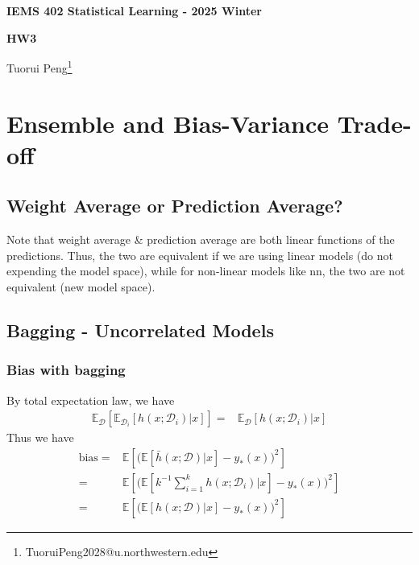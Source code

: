 \documentclass[11pt,a4paper]{ctexart}
\numberwithin{equation}{section}%
\begin{document}
\begin{center}\thispagestyle{plain}

{\LARGE\textbf{IEMS 402 Statistical Learning - 2025 Winter}}

{\Large\textbf{HW3}}

Tuorui Peng\footnote{TuoruiPeng2028@u.northwestern.edu}
\end{center}

\thispagestyle{myheadings}
\pagestyle{myheadings}




\section{Ensemble and Bias-Variance Trade-off}

\subsection{Weight Average or Prediction Average?}


Note that weight average \& prediction average are both linear functions of the predictions. Thus, the two are equivalent if we are using linear models (do not expending the model space), while for non-linear models like nn, the two are not equivalent (new model space).

\subsection{Bagging - Uncorrelated Models}

\subsubsection{Bias with bagging}

By total expectation law, we have
\begin{align*}
    \mathbb{E}_{\mathcal{D}}\left[ \mathbb{E}_{\mathcal{D}_i}\left[ h(x;\mathcal{D}_i)|x \right]   \right]  =& \mathbb{E}_{\mathcal{D}}\left[  h(x;\mathcal{D}_i)|x \right]   
\end{align*}
Thus we have
\begin{align*}
    \mathrm{ bias }=& \mathbb{E}\left[ \big(\mathbb{E}\left[ \bar{h}(x;\mathcal{D})|x \right]  - y_*(x)\big)^2 \right] \\
    =&   \mathbb{E}\left[ \big(\mathbb{E}\left[ k^{-1}\sum_{i=1}^k h(x;\mathcal{D}_i)  |x \right]  - y_*(x)\big)^2 \right] \\
    =&  \mathbb{E}\left[ \big(\mathbb{E}\left[ h(x;\mathcal{D})|x \right]  - y_*(x)\big)^2 \right] 
\end{align*}
\end{document}
